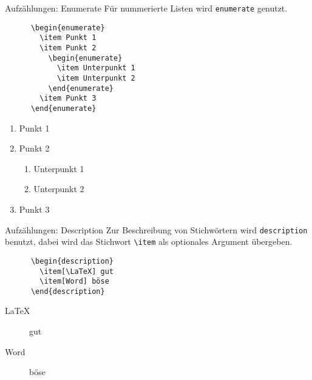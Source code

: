 \begin{frame}[fragile]{Aufzählungen: Enumerate}
  Für nummerierte Listen wird \texttt{enumerate} genutzt.
  \begin{CodeExample}{0.48}
    \begin{lstlisting}
      \begin{enumerate}
        \item Punkt 1
        \item Punkt 2
          \begin{enumerate}
            \item Unterpunkt 1
            \item Unterpunkt 2
          \end{enumerate}
        \item Punkt 3
      \end{enumerate}
    \end{lstlisting}
  \CodeResult
    \begin{enumerate}
      \item Punkt 1
      \item Punkt 2
        \begin{enumerate}
          \item Unterpunkt 1
          \item Unterpunkt 2
        \end{enumerate}
      \item Punkt 3
    \end{enumerate}
  \end{CodeExample}
\end{frame}

\begin{frame}[fragile]{Aufzählungen: Description}
  Zur Beschreibung von Stichwörtern wird \texttt{description} benutzt, dabei wird das
Stichwort \lstinline+\item+ als optionales Argument übergeben.
  \begin{CodeExample}{0.48}
    \begin{lstlisting}
      \begin{description}
        \item[\LaTeX] gut
        \item[Word] böse
      \end{description}
    \end{lstlisting}
  \CodeResult
    \begin{description}
      \item[\LaTeX] gut
      \item[Word] böse
    \end{description}
  \end{CodeExample}
\end{frame}

